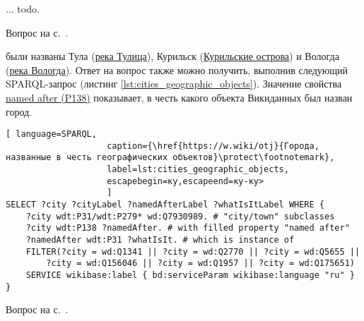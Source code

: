 \begin{task}
    \label{answer:global-vars-pros-cons}
     ... todo. 

    \small{Вопрос на с.~\pageref{fig:block:proc:swap:colors}.}
\end{task}

\begin{task}
    \label{answer:cities_geographic_objects}
     были названы Тула (\href{https://w.wiki/oLJ}{река Тулица}), Курильск (\href{https://w.wiki/oLH}{Курильские острова}) и Вологда (\href{https://w.wiki/oLG}{река Вологда}). Ответ на вопрос также можно получить, выполнив следующий SPARQL-запрос (листинг \ref{lst:cities_geographic_objects}). Значение свойства \href{https://www.wikidata.org/wiki/Property:P138}{named after (P138)} показывает, в честь какого объекта Викиданных был назван город.
    
    
    \begin{lstlisting}[ language=SPARQL, 
                    caption={\href{https://w.wiki/otj}{Города, названные в честь географических объектов}\protect\footnotemark},
                    label=lst:cities_geographic_objects, 
                    escapebegin=ку,escapeend=ку-ку>
                    ]
SELECT ?city ?cityLabel ?namedAfterLabel ?whatIsItLabel WHERE {
	?city wdt:P31/wdt:P279* wd:Q7930989. # "city/town" subclasses
	?city wdt:P138 ?namedAfter. # with filled property "named after"
	?namedAfter wdt:P31 ?whatIsIt. # which is instance of
	FILTER(?city = wd:Q1341 || ?city = wd:Q2770 || ?city = wd:Q5655 ||
		?city = wd:Q156046 || ?city = wd:Q1957 || ?city = wd:Q175651)
	SERVICE wikibase:label { bd:serviceParam wikibase:language "ru" }
}
    \end{lstlisting}
    \small{Вопрос на с.~\pageref{lst:population_town}.}
\end{task}


